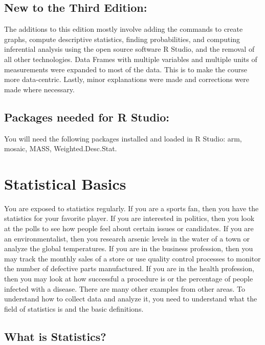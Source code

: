 \documentclass[
]{book}
\begin{document}
\hypertarget{new-to-the-third-edition}{%
\section{New to the Third Edition:}\label{new-to-the-third-edition}}

The additions to this edition mostly involve adding the commands to create graphs, compute descriptive statistics, finding probabilities, and computing inferential analysis using the open source software R Studio, and the removal of all other technologies. Data Frames with multiple variables and multiple units of measurements were expanded to most of the data. This is to make the course more data-centric. Lastly, minor explanations were made and corrections were made where necessary.

\hypertarget{packages-needed-for-r-studio}{%
\section{Packages needed for R Studio:}\label{packages-needed-for-r-studio}}

You will need the following packages installed and loaded in R Studio: arm, mosaic, MASS, Weighted.Desc.Stat.

\hypertarget{statistical-basics}{%
\chapter{Statistical Basics}\label{statistical-basics}}

You are exposed to statistics regularly. If you are a sports fan, then you have the statistics for your favorite player. If you are interested in politics, then you look at the polls to see how people feel about certain issues or candidates. If you are an environmentalist, then you research arsenic levels in the water of a town or analyze the global temperatures. If you are in the business profession, then you may track the monthly sales of a store or use quality control processes to monitor the number of defective parts manufactured. If you are in the health profession, then you may look at how successful a procedure is or the percentage of people infected with a disease. There are many other examples from other areas. To understand how to collect data and analyze it, you need to understand what the field of statistics is and the basic definitions.

\hypertarget{what-is-statistics}{%
\section{What is Statistics?}\label{what-is-statistics}}
\end{document}

